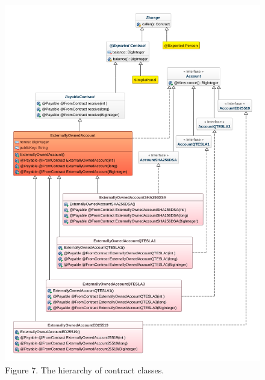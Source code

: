 \documentclass[a4paper,]{book}
\begin{document}
{\begin{figure}
\centering
\includegraphics[width=1.05\textwidth,height=\textheight]{pics/contracts.png}
\caption{Figure 7. The hierarchy of contract classes.}
\end{figure}

}
\end{document}
